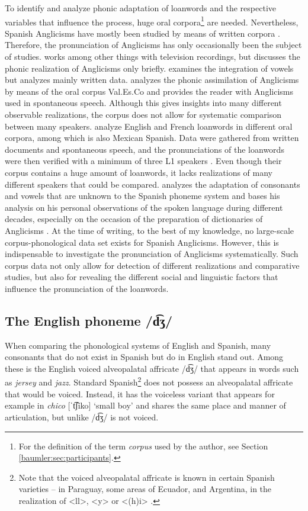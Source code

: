 \documentclass[output=paper]{langscibook}
\begin{document}
To identify and analyze phonic adaptation of loanwords and the respective variables that influence the process, huge oral corpora\footnote{For the definition of the term \textit{corpus} used by the author, see Section \ref{baumler:sec:participants}.} are needed. Nevertheless, Spanish Anglicisms have mostly been studied by means of written corpora \citetext{\citealp[100]{RodriguezGonzalez2017}; \citealp[6]{GomezCapuz2001}}. Therefore, the pronunciation of Anglicisms has only occasionally been the subject of studies. \citet{Pratt1980} works among other things with television recordings, but discusses the phonic realization of Anglicisms only briefly.  \citet[]{Lorenzo1997} examines the integration of vowels but analyzes mainly written data. \citet[]{GomezCapuz2001} analyzes the phonic assimilation of Anglicisms by means of the oral corpus Val.Es.Co \citep[]{Briz1995} and provides the reader with Anglicisms used in spontaneous speech. Although this gives insights into many different observable realizations, the corpus does not allow for systematic comparison between many speakers. \citet[]{LaCharite2005} analyze English and French loanwords in different oral corpora, among which is also Mexican Spanish. Data were gathered from written documents and spontaneous speech, and the pronunciations of the loanwords were then verified with a minimum of three L1 speakers \citep[228]{LaCharite2005}. Even though their corpus contains a huge amount of loanwords, it lacks realizations of many different speakers that could be compared. \citet[]{RodriguezGonzalez2017} analyzes the adaptation of consonants and vowels that are unknown to the Spanish phoneme system and bases his analysis on his personal observations of the spoken language during different decades, especially on the occasion of the preparation of dictionaries of Anglicisms \citep[100]{RodriguezGonzalez2017}. At the time of writing, to the best of my knowledge, no large-scale corpus-phonological data set exists for Spanish Anglicisms. However, this is indispensable to investigate the pronunciation of Anglicisms systematically. Such corpus data not only allow for detection of different realizations and comparative studies, but also for revealing the different social and linguistic factors that influence the pronunciation of the loanwords.
\subsection{The English phoneme /d͡ʒ/}
\label{baumler:sec:phoneme}
When comparing the phonological systems of English and Spanish, many consonants that do not exist in Spanish but do in English stand out. Among these is the English voiced alveopalatal affricate /d͡ʒ/ that appears in words such as \textit{jersey} and \textit{jazz}. Standard Spanish\footnote{Note that the voiced alveopalatal affricate is known in certain Spanish varieties – in Paraguay, some areas of Ecuador, and Argentina, in
the realization of <ll>, <y> or <(h)i> \citep[226]{2011Ngdl}.} does not possess an alveopalatal affricate that would be voiced. Instead, it has the voiceless variant that appears for example in \textit{chico} [ˈt͡ʃiko]
‘small boy' and shares the same place and manner of articulation, but unlike /d͡ʒ/ is not voiced.
\end{document}
